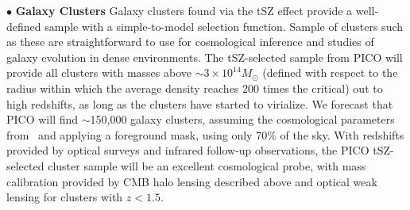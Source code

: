 \documentclass[PICOReport.tex]{subfiles}
\begin{document}
%
\noindent$\bullet$ {\bf Galaxy Clusters} \hspace{0.1in} \label{clusters}  Galaxy clusters found via the tSZ  effect provide a well-defined sample with a simple-to-model selection function. Sample of clusters such as these are straightforward to use for cosmological inference and studies of galaxy evolution in dense environments. The tSZ-selected sample from PICO will provide all clusters with masses above $\sim3\times10^{14} M_\odot$ (defined with respect to the radius within which the average density reaches 200 times the critical) out to high redshifts, 
as long as the clusters have started to virialize. We forecast that PICO will find $\sim$150,000 galaxy clusters, assuming the cosmological parameters from \planck\ and applying a foreground mask, using only 70\% of the sky. With redshifts provided by optical surveys and infrared follow-up observations, the PICO tSZ-selected cluster sample will be an excellent cosmological probe, with mass calibration provided by CMB halo lensing described above and optical weak lensing for clusters with $z < 1.5$. 
\end{document}
